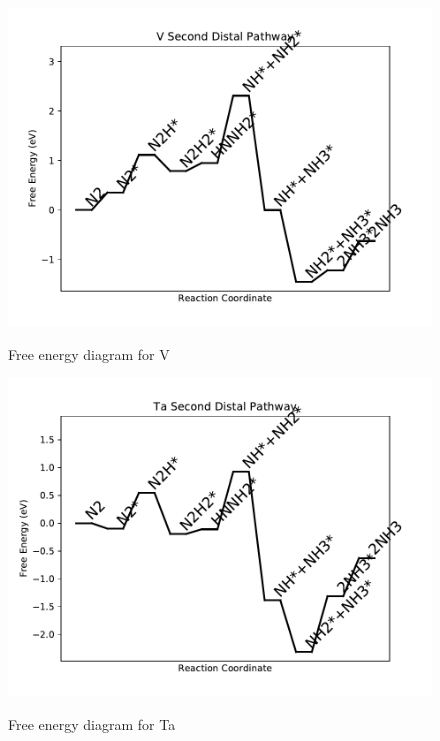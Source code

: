 \documentclass{article}
\begin{document}
\begin{figure}
\includegraphics[width=1\linewidth]{data/plots/V_distal_2.pdf}
\label{fig:V_distal_2}
\caption{Free energy diagram for V}
\end{figure}

\begin{figure}
\includegraphics[width=1\linewidth]{data/plots/Ta_distal_2.pdf}
\label{fig:Ta_distal_2}
\caption{Free energy diagram for Ta}
\end{figure}
\end{document}
